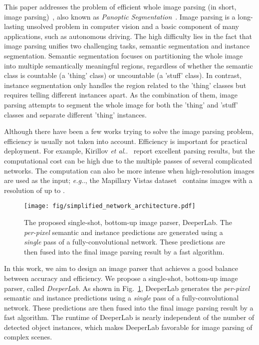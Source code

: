 \documentclass[10pt,twocolumn,letterpaper]{article}
\makeatletter
\def\@onedot{\ifx\@let@token.\else.\null\fi\xspace}
\DeclareRobustCommand\onedot{\futurelet\@let@token\@onedot}
\def\eg{\emph{e.g}\onedot} \def\Eg{\emph{E.g}\onedot}
\def\etal{\emph{et al}\onedot}
\makeatother
\begin{document}
This paper addresses the problem of efficient whole image parsing (in short, image parsing)~\cite{tu2005image}, also known as \emph{Panoptic Segmentation}~\cite{kirillov2018panoptic}. Image parsing is a long-lasting unsolved problem in computer vision and a basic component of many applications, such as autonomous driving. The high difficulty lies in the fact that image parsing unifies two challenging tasks, semantic segmentation and instance segmentation. Semantic segmentation focuses on partitioning the whole image into multiple semantically meaningful regions, regardless of whether the semantic class is countable (a 'thing' class) or uncountable (a 'stuff' class). In contrast, instance segmentation only handles the region related to the 'thing' classes but requires telling different instances apart. As the combination of them, image parsing attempts to segment the whole image for both the 'thing' and 'stuff' classes and separate different 'thing' instances.

Although there have been a few works trying to solve the image parsing problem, efficiency is usually not taken into account. Efficiency is important for practical deployment. For example, Kirillov \etal~\cite{kirillov2018panoptic} report excellent parsing results, but the computational cost can be high due to the multiple passes of several complicated networks. The computation can also be more intense when high-resolution images are used as the input; \eg, the Mapillary Vistas dataset~\cite{neuhold2017mapillary} contains images with a resolution of up to .

\begin{figure}[!t]
    \centering
    \texttt{[image: fig/simplified\_network\_architecture.pdf]}
    \caption{The proposed single-shot, bottom-up image parser, DeeperLab. The \emph{per-pixel} semantic and instance predictions are generated using a \emph{single} pass of a fully-convolutional network. These predictions are then fused into the final image parsing result by a fast algorithm.}
    \label{fig:simplified_network_architecture}
\end{figure}

In this work, we aim to design an image parser that achieves a good balance between accuracy and efficiency. We propose a single-shot, bottom-up image parser, called \emph{DeeperLab}. As shown in Fig.~\ref{fig:simplified_network_architecture}, DeeperLab generates the \emph{per-pixel} semantic and instance predictions using a \emph{single} pass of a fully-convolutional network. These predictions are then fused into the final image parsing result by a fast algorithm. The runtime of DeeperLab is nearly independent of the number of detected object instances, which makes DeeperLab favorable for image parsing of complex scenes.
\end{document}
